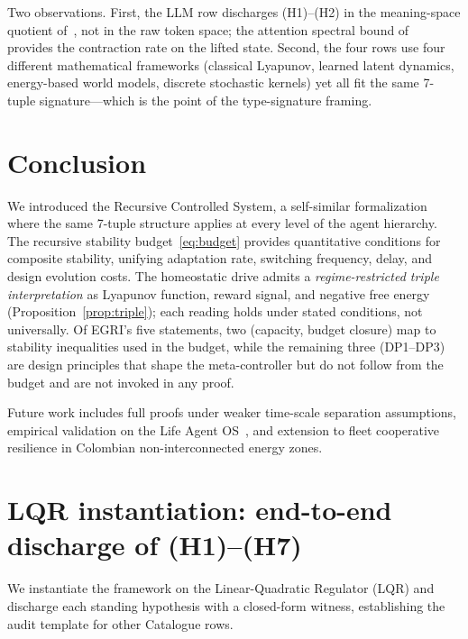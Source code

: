 \documentclass[conference]{IEEEtran}
\begin{document}
Two observations.  First, the LLM row discharges (H1)--(H2) in the
meaning-space quotient of~\cite{soatto2023taming}, not in the raw
token space; the attention spectral bound
of~\cite{bhargava2023magic} provides the contraction rate on the
lifted state.  Second, the four rows use four different mathematical
frameworks (classical Lyapunov, learned latent dynamics, energy-based
world models, discrete stochastic kernels) yet all fit the same
7-tuple signature---which is the point of the type-signature framing.

\section{Conclusion}
\label{sec:conclusion}

We introduced the Recursive Controlled System, a self-similar formalization
where the same 7-tuple structure applies at every level of the agent
hierarchy.  The recursive stability budget~\eqref{eq:budget} provides
quantitative conditions for composite stability, unifying adaptation rate,
switching frequency, delay, and design evolution costs.  The homeostatic
drive admits a \emph{regime-restricted triple interpretation} as
Lyapunov function, reward signal, and negative free energy
(Proposition~\ref{prop:triple}); each reading holds under stated
conditions, not universally.  Of EGRI's five statements, two (capacity,
budget closure) map to stability inequalities used in the budget, while
the remaining three (DP1--DP3) are design principles that shape the
meta-controller but do not follow from the budget and are not invoked
in any proof.

Future work includes full proofs under weaker time-scale separation
assumptions, empirical validation on the Life Agent OS~\cite{eslami2026control},
and extension to fleet cooperative resilience in Colombian non-interconnected
energy zones.

\appendix
\section{LQR instantiation: end-to-end discharge of (H1)--(H7)}
\label{sec:app-lqr}

We instantiate the framework on the Linear-Quadratic Regulator (LQR)
and discharge each standing hypothesis with a closed-form witness,
establishing the audit template for other Catalogue rows.
\end{document}
